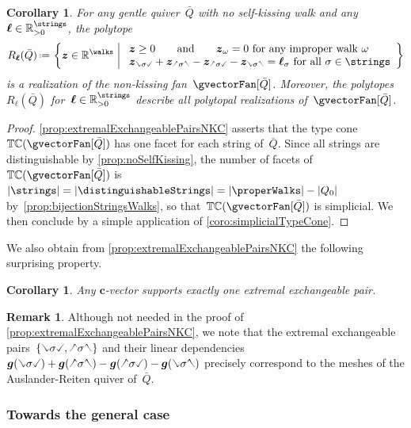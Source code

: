 \documentclass{amsart}
\newtheorem{corollary}[theorem]{Corollary}
\theoremstyle{definition}
\newtheorem{remark}[theorem]{Remark}
\newcommand{\R}{\mathbb{R}} %
\renewcommand{\b}[1]{{\boldsymbol{#1}}} %
\newcommand{\set}[2]{\left\{ #1 \;\middle|\; #2 \right\}} %
\newcommand{\eqdef}{\mbox{\,\raisebox{0.2ex}{\scriptsize\ensuremath{\mathrm:}}\ensuremath{=}\,}} %
\newcommand{\gvector}[1]{\b{g}(#1)} %
\newcommand{\typeCone}{\mathbb{TC}} %
\newcommand{\quiver}{\bar Q} %
\newcommand{\hL}{\text{\rotatebox[origin=c]{180}{\checked}}}
\newcommand{\hR}{\text{\rotatebox[origin=c]{180}{\reflectbox{\checked}}}}
\newcommand{\cL}{\text{\reflectbox{\checked}}}
\newcommand{\cR}{\text{\checked}}
\newcommand{\hh}[1]{\hL#1\hR} %
\newcommand{\cc}[1]{\cL#1\cR} %
\newcommand{\hc}[1]{\hL#1\cR} %
\newcommand{\ch}[1]{\cL#1\hR} %
\begin{document}
\begin{corollary}
For any gentle quiver~$\quiver$ with no self-kissing walk and any~$\b{\ell} \in \R_{>0}^{\strings}$, the polytope
\[
R_\b{\ell}(\quiver) \eqdef \set{\b{z} \in \R^{\walks}}{\begin{array}{l} \b{z} \ge 0 \qquad\text{and}\qquad \b{z}_\omega = 0 \text{ for any improper walk } \omega \\ \b{z}_{\cc{\sigma}} + \b{z}_{\hh{\sigma}} - \b{z}_{\hc{\sigma}} - \b{z}_{\ch{\sigma}} = \b{\ell}_\sigma \text{ for all } \sigma \in \strings\end{array}}
\]
is a realization of the non-kissing fan~$\gvectorFan[\quiver]$.
Moreover, the polytopes~$R_\b{\ell}(\quiver)$ for~$\b{\ell} \in \R_{>0}^{\strings}$ describe all polytopal realizations of~$\gvectorFan[\quiver]$.
\end{corollary}

\begin{proof}
\cref{prop:extremalExchangeablePairsNKC} asserts that the type cone~$\typeCone(\gvectorFan[\quiver])$ has one facet for each string of~$\quiver$.
Since all strings are distinguishable by \cref{prop:noSelfKissing}, the number of facets of~$\typeCone(\gvectorFan[\quiver])$ is $|\strings| = |\distinguishableStrings| = |\properWalks| - |Q_0|$ by~\cref{prop:bijectionStringsWalks}, so that~$\typeCone(\gvectorFan[\quiver])$ is simplicial. We then conclude by a simple application of \cref{coro:simplicialTypeCone}.
\end{proof}

We also obtain from \cref{prop:extremalExchangeablePairsNKC} the following surprising property.

\begin{corollary}
Any $\b{c}$-vector supports exactly one extremal exchangeable pair.
\end{corollary}

\begin{remark}
\label{rem:meshARquiver}
Although not needed in the proof of \cref{prop:extremalExchangeablePairsNKC}, we note that the extremal exchangeable pairs~$\{\cc{\sigma}, \hh{\sigma}\}$ and their linear dependencies~${\gvector{\cc{\sigma}} + \gvector{\hh{\sigma}} - \gvector{\hc{\sigma}} - \gvector{\ch{\sigma}}}$ precisely correspond to the meshes of the Auslander-Reiten quiver of~$\quiver$.
\end{remark}

\subsubsection{Towards the general case}
\end{document}
